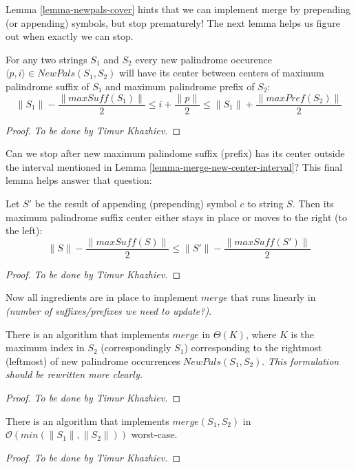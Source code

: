 Lemma \ref{lemma-newpals-cover} hints that we can implement
merge by prepending (or appending) symbols, but stop prematurely!
The next lemma helps us figure out when exactly we can stop.

\begin{lemma}
\label{lemma-merge-new-center-interval}
  For any two strings $S_1$ and $S_2$
  every new palindrome occurence
  $\langle p, i \rangle \in NewPals(S_1, S_2)$
  will have its center
  between centers of maximum palindrome suffix of $S_1$
  and maximum palindrome prefix of $S_2$:
  \[
  \|S_1\| - \frac{\|\mathit{maxSuff}(S_1)\|}{2} \le
  i + \frac{\|p\|}{2} \le
  \|S_1\| + \frac{\|\mathit{maxPref}(S_2)\|}{2}
  \]
\end{lemma}
\begin{proof}
  \emph{To be done by Timur Khazhiev.}
\end{proof}

Can we stop after new maximum palindome suffix (prefix)
has its center outside the interval mentioned in Lemma \ref{lemma-merge-new-center-interval}?
This final lemma helps answer that question:

\begin{lemma}
\label{lemma-center-move}
  Let $S'$ be the result of appending (prepending) symbol $c$ to string $S$.
  Then its maximum palindrome suffix center either stays in place
  or moves to the right (to the left):
  \[
  \|S\| - \frac{\|\mathit{maxSuff}(S)\|}{2} \le \|S'\| - \frac{\|\mathit{maxSuff}(S')\|}{2}
  \]
\end{lemma}
\begin{proof}
  \emph{To be done by Timur Khazhiev.}
\end{proof}

Now all ingredients are in place to implement $merge$
that runs linearly in \textit{(number of suffixes/prefixes we need to update?)}.

\begin{theorem}
  There is an algorithm that implements $merge$ in $\Theta(K)$,
  where $K$ is the maximum index in $S_2$ (correspondingly $S_1$)
  corresponding to the rightmost (leftmost)
  of new palindrome occurrences $NewPals(S_1, S_2)$.
  \emph{This formulation should be rewritten more clearly.}
\end{theorem}
\begin{proof}
  \emph{To be done by Timur Khazhiev.}
\end{proof}

\begin{corollary}
  There is an algorithm that implements $merge(S_1, S_2)$
  in $\mathcal{O}(min(\|S_1\|, \|S_2\|))$ worst-case.
\end{corollary}
\begin{proof}
  \emph{To be done by Timur Khazhiev.}
\end{proof}

